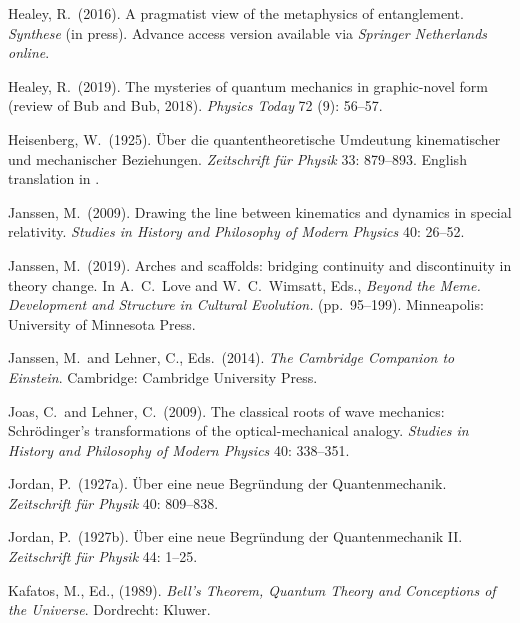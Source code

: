 \documentclass[12pt]{article}
\numberwithin{equation}{section}
\begin{document}
\begin{thebibliography}{}
 Healey, R.\ (2016). A pragmatist view of the metaphysics of entanglement. \emph{Synthese} (in press). Advance access version available via \emph{Springer Netherlands online}.

 Healey, R.\ (2019). The mysteries of quantum mechanics in graphic-novel form (review of Bub and Bub, 2018). \emph{Physics Today}  72 (9): 56--57. 

 Heisenberg, W.\ (1925). \"Uber die quantentheoretische Umdeutung kinematischer und mechanischer Beziehungen. \emph{Zeitschrift f\"ur Physik} 33: 879--893. English translation in \citet[pp.\ 261--276]{Van der Waerden}.


 Janssen, M.\ (2009). Drawing the line between kinematics and dynamics in special relativity. \emph{Studies in History and Philosophy of Modern Physics} 40: 26--52.

 Janssen, M.\ (2019). Arches and scaffolds: bridging continuity and discontinuity in theory change. In A.\ C.\ Love and W.\ C.\ Wimsatt, Eds., \emph{Beyond the Meme. Development and Structure in Cultural Evolution.} (pp.\ 95--199). Minneapolis: University of Minnesota Press.

 Janssen, M.\ and Lehner, C., Eds.\ (2014). \emph{The Cambridge Companion to Einstein}. Cambridge: Cambridge University Press.

 Joas, C.\ and Lehner, C.\ (2009). The classical roots of wave mechanics: Schr\"odinger's transformations of the optical-mechanical analogy. \emph{Studies in History and Philosophy of Modern Physics} 40: 338--351.

 Jordan, P.\ (1927a).  \"Uber eine neue Begr\"undung der Quantenmechanik. \emph{Zeitschrift f\"ur Physik} 40: 809--838. 

 Jordan, P.\  (1927b).  \"Uber eine neue Begr\"undung der Quantenmechanik II. \emph{Zeitschrift f\"ur Physik} 44: 1--25.

 Kafatos, M., Ed., (1989).  \emph{Bell's Theorem, Quantum Theory and Conceptions of the Universe}. Dordrecht: Kluwer. 


\end{thebibliography}
\end{document}
